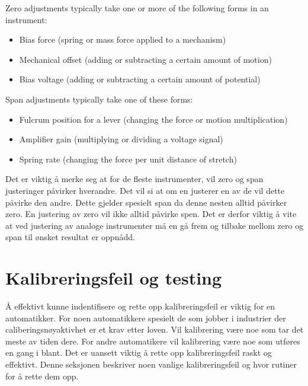 \vskip 10pt

\filbreak

\noindent
Zero adjustments typically take one or more of the following forms in an instrument:

\begin{itemize}
\item Bias force (spring or mass force applied to a mechanism)
\item Mechanical offset (adding or subtracting a certain amount of motion)
\item Bias voltage (adding or subtracting a certain amount of potential)
\end{itemize}

\filbreak

\noindent
Span adjustments typically take one of these forms:

\begin{itemize}
\item Fulcrum position for a lever (changing the force or motion multiplication)
\item Amplifier gain (multiplying or dividing a voltage signal)
\item Spring rate (changing the force per unit distance of stretch)
\end{itemize}

Det er viktig å merke seg at for de fleste instrumenter, vil zero og span justeringer påvirker hverandre. Det vil si at om en justerer en av de vil dette påvirke den andre. Dette gjelder spesielt span da denne nesten alltid påvirker zero. En justering av zero vil ikke alltid påvirke spen. Det er derfor viktig å vite at ved justering av analoge instrumenter må en gå frem og tilbake mellom zero og span til ønsket resultat er oppnådd. 

 



\filbreak
\section{Kalibreringsfeil og testing}

Å effektivt kunne indentifisere og rette opp kalibreringsfeil er viktig for en automatikker. For noen automatikkere spesielt de som jobber i industrier der caliberingsnøyaktivhet er et krav etter loven. Vil kalibrering være noe som tar det meste av tiden dere. For andre automatikere vil kalibrering være noe som utføres en gang i blant. Det er uansett viktig å rette opp kalibreringsfeil raskt og effektivt. Denne seksjonen beskriver noen vanlige kalibreringsfeil og hvor rutiner for å rette dem opp. 




